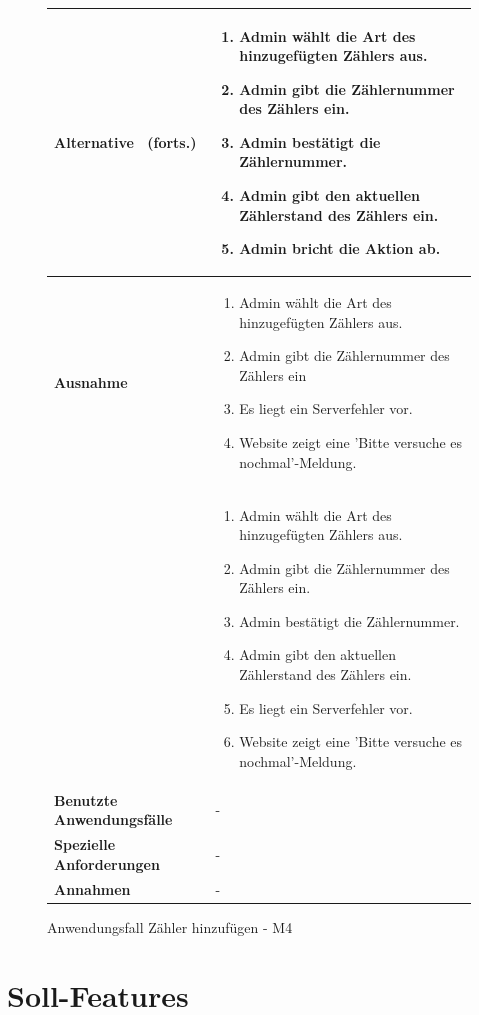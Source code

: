 \begin{figure}[H]
	\centering
	\begin{tabularx}{\textwidth}{ X | X }
	\hline
	\textbf{Alternative} \ (forts.)&
		\begin{enumerate}
			\item Admin wählt die Art des hinzugefügten Zählers aus.
			\item Admin gibt die Zählernummer des Zählers ein.
			\item Admin bestätigt die Zählernummer.
			\item Admin gibt den aktuellen Zählerstand des Zählers ein.
			\item Admin bricht die Aktion ab.
		\end{enumerate} \\ \hline
		\textbf{Ausnahme} & 
		\begin{enumerate}
			\item Admin wählt die Art des hinzugefügten Zählers aus.
			\item Admin gibt die Zählernummer des Zählers ein
			\item Es liegt ein Serverfehler vor.
			\item Website zeigt eine 'Bitte versuche es nochmal'-Meldung.
		\end{enumerate} \\ &
		\begin{enumerate}
			\item Admin wählt die Art des hinzugefügten Zählers aus.
			\item Admin gibt die Zählernummer des Zählers ein.
			\item Admin bestätigt die Zählernummer.
			\item Admin gibt den aktuellen Zählerstand des Zählers ein.
			\item Es liegt ein Serverfehler vor.
			\item Website zeigt eine 'Bitte versuche es nochmal'-Meldung.
		\end{enumerate} \\ \hline
		\textbf{Benutzte Anwendungsfälle} & - \\ \hline
		\textbf{Spezielle Anforderungen} & - \\ \hline
		\textbf{Annahmen} & -
	\end{tabularx}
	\caption{Anwendungsfall Zähler hinzufügen - M4}
	\label{fig:anwendungsfall-server-tabelle-xx-1}
\end{figure}
\newpage

\section{Soll-Features}

